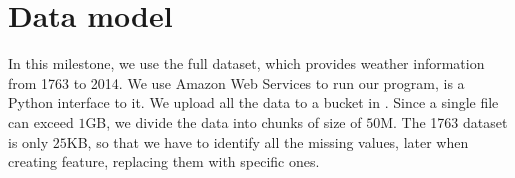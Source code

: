 \section{Data model}
    In this milestone, we use the full \cite{GHCN-D} dataset, which provides weather information from 1763 to 2014. 
    We use Amazon Web Services to run our program, \cite{boto} is a Python interface to it. We upload all the data to a bucket in \cite{S3}. Since a single file can exceed $1$GB, we divide the data into chunks of size of $50$M.
    The 1763 dataset is only $25$KB, so that we have to identify all the missing values, later when creating feature, replacing them with specific ones.
